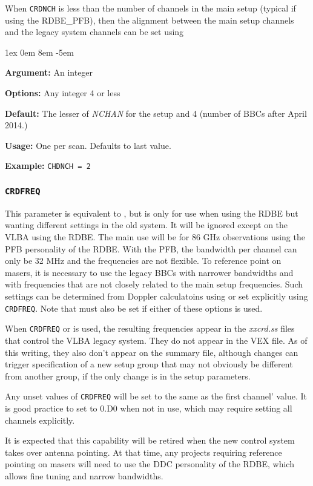 \documentclass{report}
\newcommand{\rcwbox}[5]{
  \begin{list}{}{\parsep 1ex  \itemsep 0em
                 \leftmargin 8em  \itemindent -5em }
    \item {\bf Argument:} #1
    \item {\bf Options:}  #2
    \item {\bf Default:}  #3
    \item {\bf Usage:}    #4
    \item {\bf Example:}  #5
  \end{list}
}
\begin{document}
When {\tt CRDNCH} is less than the number of channels in the main setup
(typical if using the RDBE\_PFB), then the alignment between the main
setup channels and the legacy system channels can be set using

\rcwbox
{An integer}
{Any integer 4 or less}
{The lesser of {\sl NCHAN} for the setup and 4 (number of BBCs after 
April 2014.)}
{One per scan.  Defaults to last value.}
{{\tt CHDNCH = 2}}

\subsubsection{\label{MP:CRDFREQ}{\tt CRDFREQ}}

This parameter is equivalent to , but is
only for use when using the RDBE but wanting different settings in the
old system.  It will be ignored except on the VLBA using the RDBE.
The main use will be for 86 GHz observations using the PFB personality
of the RDBE.  With the PFB, the bandwidth per channel can only be 32
MHz and the frequencies are not flexible.  To reference point on
masers, it is necessary to use the legacy BBCs with narrower
bandwidths and with frequencies that are not closely related to the
main setup frequencies.  Such settings can be determined from Doppler
calculatoins using  or set explicitly
using {\tt CRDFREQ}.  Note that  must
also be set if either of these options is used.

When {\tt CRDFREQ} or  is used, the
resulting frequencies appear in the {\sl xxcrd.ss} files that control
the VLBA legacy system.  They do not appear in the VEX file.  As of
this writing, they also don't appear on the summary file, although
changes can trigger specification of a new setup group that may not
obviously be different from another group, if the only change is 
in the setup parameters.

Any unset values of {\tt CRDFREQ} will be set to the same as the first
channel' value.  It is good practice to set to 0.D0 when not in use,
which may require setting all channels explicitly.

It is expected that this capability will be retired when the new
control system takes over antenna pointing.  At that time, any projects
requiring reference pointing on masers will need to use the DDC
personality of the RDBE, which allows fine tuning and narrow bandwidths.
\end{document}
